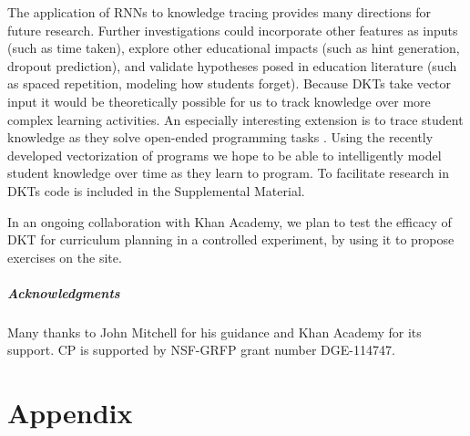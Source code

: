 \documentclass{article} \usepackage{nips,times}
\begin{document}
The application of RNNs to knowledge tracing provides many directions for future research. Further investigations could incorporate other features as inputs (such as time taken), explore other educational impacts (such as hint generation, dropout prediction), and validate hypotheses posed in education literature (such as spaced repetition, modeling how students forget).
Because DKTs take vector input it would be theoretically possible for us to track knowledge over more complex learning activities.
An especially interesting extension is to trace student knowledge as they solve open-ended programming tasks \cite{piech2015autonomously,piech2012modeling}.
Using the recently developed vectorization of programs \cite{piechICML15} we hope to be able to intelligently model student knowledge over time as they learn to program.  To facilitate research in DKTs code is included in the Supplemental Material. 

In an ongoing collaboration with Khan Academy, we plan to test the efficacy of DKT for curriculum planning in a controlled experiment, by using it to propose exercises on the site. 

\vspace{-1mm}
 \subsubsection*{Acknowledgments}
 \vspace{-1mm}

Many thanks to John Mitchell for his guidance and Khan Academy for its support. CP is supported by NSF-GRFP grant number DGE-114747.
\vspace{-1mm}









\small





\newpage
\normalsize
\appendix
\part*{Appendix}

\setcounter{figure}{0} \renewcommand{\thefigure}{A.\arabic{figure}}
\setcounter{table}{0} \renewcommand{\thetable}{A.\arabic{table}}
\end{document}
